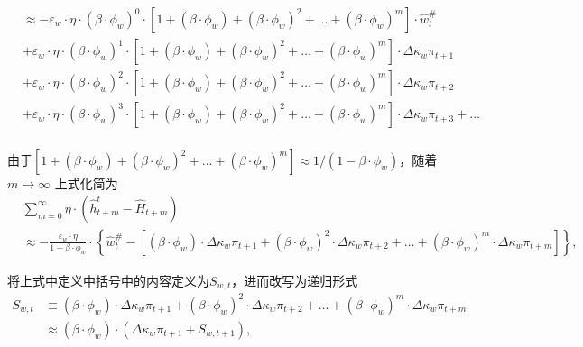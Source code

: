 \begin{equation*}
\begin{split}
&\approx -\varepsilon_w \cdot \eta \cdot \left(\beta \cdot \phi_w\right)^{0} \cdot \left[1+\left(\beta \cdot \phi_w\right)+\left(\beta \cdot \phi_w\right)^2 + \ldots + \left(\beta \cdot \phi_w\right)^m\right] \cdot \hat{w}^{\#}_t \\
&+\varepsilon_w \cdot \eta \cdot \left(\beta \cdot \phi_w\right)^{1} \cdot \left[1+\left(\beta \cdot \phi_w\right)+\left(\beta \cdot \phi_w\right)^2 + \ldots + \left(\beta \cdot \phi_w\right)^m\right] \cdot  \Delta\kappa_w\pi_{t+1}\\
&+\varepsilon_w \cdot \eta \cdot \left(\beta \cdot \phi_w\right)^{2} \cdot \left[1+\left(\beta \cdot \phi_w\right)+\left(\beta \cdot \phi_w\right)^2 + \ldots + \left(\beta \cdot \phi_w\right)^m\right] \cdot  \Delta\kappa_w\pi_{t+2}\\
&+\varepsilon_w \cdot \eta \cdot \left(\beta \cdot \phi_w\right)^{3} \cdot \left[1+\left(\beta \cdot \phi_w\right)+\left(\beta \cdot \phi_w\right)^2 + \ldots + \left(\beta \cdot \phi_w\right)^m\right] \cdot  \Delta\kappa_w\pi_{t+3} + \ldots \\
\end{split}
\end{equation*}

由于$\left[1+\left(\beta \cdot \phi_w\right)+\left(\beta \cdot \phi_w\right)^2 + \ldots + \left(\beta \cdot \phi_w\right)^m\right] \approx 1/(1-\beta \cdot \phi_w)$，随着$m \rightarrow \infty$ 上式化简为
\begin{equation}
\label{eq:union-wage-PC-htm-rev}
\begin{split}
&\sum_{m=0}^{\infty} \eta \cdot \left(\hat{h}_{t+m}^t - \hat{H}_{t+m}\right) \\
&\approx - \frac{\varepsilon_w \cdot \eta}{1-\beta \cdot \phi_w} \cdot
\left\{\hat{w}^{\#}_t - \left[\left(\beta \cdot \phi_w \right) \cdot \Delta\kappa_w \pi_{t+1}+\left(\beta \cdot \phi_w \right)^2 \cdot \Delta\kappa_w \pi_{t+2} + \ldots + \left(\beta \cdot \phi_w \right)^m \cdot \Delta\kappa_w \pi_{t+m}\right]\right\},
\end{split}
\end{equation}

将上式中定义中括号中的内容定义为$S_{w,t}$，进而改写为递归形式
\begin{equation}
\begin{split}
\label{eq:union-wage-PC-Swt}
S_{w,t} &\equiv \left(\beta \cdot \phi_w \right) \cdot \Delta\kappa_w \pi_{t+1}+\left(\beta \cdot \phi_w \right)^2 \cdot \Delta\kappa_w \pi_{t+2} + \ldots + \left(\beta \cdot \phi_w \right)^m \cdot \Delta\kappa_w \pi_{t+m}\\
&\approx \left(\beta \cdot \phi_w \right) \cdot \left(\Delta \kappa_w \pi_{t+1} + S_{w,t+1}\right),
\end{split}
\end{equation}

